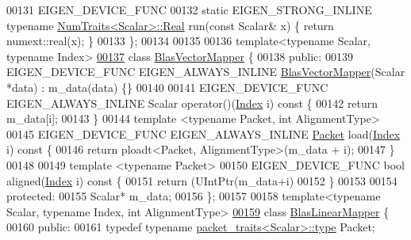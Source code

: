 \begin{DoxyCode}
00131   EIGEN\_DEVICE\_FUNC
00132   \textcolor{keyword}{static} EIGEN\_STRONG\_INLINE \textcolor{keyword}{typename} \hyperlink{group___core___module_struct_eigen_1_1_num_traits}{NumTraits<Scalar>::Real} run(\textcolor{keyword}{const} Scalar& x) \{
       \textcolor{keywordflow}{return} numext::real(x); \}
00133 \};
00134 
00135 
00136 \textcolor{keyword}{template}<\textcolor{keyword}{typename} Scalar, \textcolor{keyword}{typename} Index>
\hyperlink{class_eigen_1_1internal_1_1_blas_vector_mapper}{00137} \textcolor{keyword}{class }\hyperlink{class_eigen_1_1internal_1_1_blas_vector_mapper}{BlasVectorMapper} \{
00138   \textcolor{keyword}{public}:
00139   EIGEN\_DEVICE\_FUNC EIGEN\_ALWAYS\_INLINE \hyperlink{class_eigen_1_1internal_1_1_blas_vector_mapper}{BlasVectorMapper}(Scalar *data) : m\_data(data) \{\}
00140 
00141   EIGEN\_DEVICE\_FUNC EIGEN\_ALWAYS\_INLINE Scalar operator()(\hyperlink{namespace_eigen_a62e77e0933482dafde8fe197d9a2cfde}{Index} i)\textcolor{keyword}{ const }\{
00142     \textcolor{keywordflow}{return} m\_data[i];
00143   \}
00144   \textcolor{keyword}{template} <\textcolor{keyword}{typename} Packet, \textcolor{keywordtype}{int} AlignmentType>
00145   EIGEN\_DEVICE\_FUNC EIGEN\_ALWAYS\_INLINE \hyperlink{union_eigen_1_1internal_1_1_packet}{Packet} load(\hyperlink{namespace_eigen_a62e77e0933482dafde8fe197d9a2cfde}{Index} i)\textcolor{keyword}{ const }\{
00146     \textcolor{keywordflow}{return} ploadt<Packet, AlignmentType>(m\_data + i);
00147   \}
00148 
00149   \textcolor{keyword}{template} <\textcolor{keyword}{typename} Packet>
00150   EIGEN\_DEVICE\_FUNC \textcolor{keywordtype}{bool} aligned(\hyperlink{namespace_eigen_a62e77e0933482dafde8fe197d9a2cfde}{Index} i)\textcolor{keyword}{ const }\{
00151     \textcolor{keywordflow}{return} (UIntPtr(m\_data+i)%
00152   \}
00153 
00154   \textcolor{keyword}{protected}:
00155   Scalar* m\_data;
00156 \};
00157 
00158 \textcolor{keyword}{template}<\textcolor{keyword}{typename} Scalar, \textcolor{keyword}{typename} Index, \textcolor{keywordtype}{int} AlignmentType>
\hyperlink{class_eigen_1_1internal_1_1_blas_linear_mapper}{00159} \textcolor{keyword}{class }\hyperlink{class_eigen_1_1internal_1_1_blas_linear_mapper}{BlasLinearMapper} \{
00160   \textcolor{keyword}{public}:
00161   \textcolor{keyword}{typedef} \textcolor{keyword}{typename} \hyperlink{struct_eigen_1_1internal_1_1packet__traits}{packet\_traits<Scalar>::type} Packet;

\end{DoxyCode}
